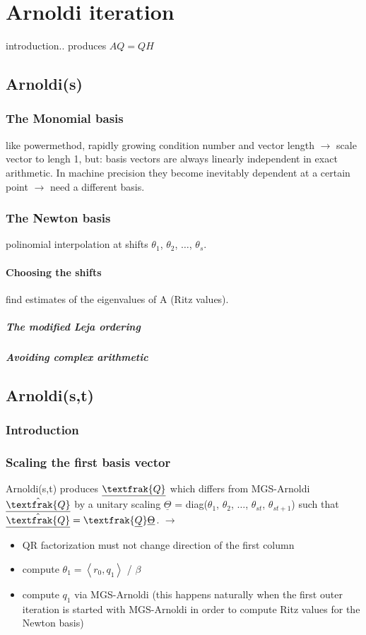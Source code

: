 \documentclass{scrartcl}
\begin{document}
\section{Arnoldi iteration}
introduction.. produces $AQ = QH$
\subsection{Arnoldi(s)}
\subsubsection{The Monomial basis}
like powermethod, rapidly growing condition number and vector length $\rightarrow$ scale vector to lengh 1, but: basis vectors are always linearly independent in exact arithmetic. In machine precision they become inevitably dependent at a certain point $\rightarrow$ need a different basis.
\subsubsection{The Newton basis}
polinomial interpolation at shifts $\theta_1$, $\theta_2$, $\ldots$, $\theta_s$.
\paragraph{Choosing the shifts}
find estimates of the eigenvalues of A (Ritz values).
\subparagraph{The modified Leja ordering}

\subparagraph{Avoiding complex arithmetic}


\subsection{Arnoldi(s,t)}
\subsubsection{Introduction}
\subsubsection{Scaling the first basis vector}
Arnoldi(s,t) produces $\underline{\textfrak{Q}}$ which differs from MGS-Arnoldi $\underline{\hat{\textfrak{Q}}}$ by a unitary scaling $\underline{\Theta}$ = diag($\theta_1$, $\theta_2$, $\ldots$, $\theta_{st}$, $\theta_{st+1}$) such that $\underline{\hat{\textfrak{Q}}} = \textfrak{\underline{Q}}\underline{\Theta}$. $\rightarrow$
\begin{itemize}
\item QR factorization must not change direction of the first column
\item compute $\theta_1 = \left< r_0, q_1 \right>$ / $\beta$
\item compute $q_1$ via MGS-Arnoldi (this happens naturally when the first outer iteration is started with MGS-Arnoldi in order to compute Ritz values for the Newton basis)
\end{itemize}
\end{document}
